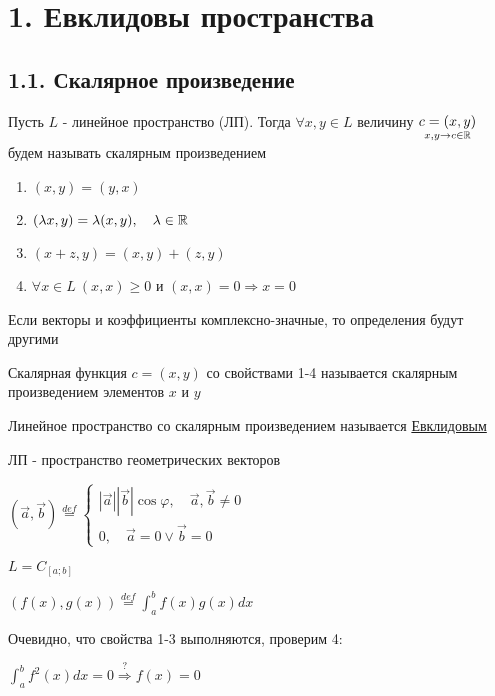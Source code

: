 \documentclass[12pt]{article}
\begin{document}
    \section{1. Евклидовы пространства}

    \subsection{1.1. Скалярное произведение}

    Пусть $L$ - линейное пространство (ЛП). Тогда $\forall x, y \in L$ величину $\underset{x, y \to c \in \mathbb{R}}{c = (x, y)}$
    будем называть скалярным произведением


    \hypertarget{scalarproductdefinition}{}

    \begin{enumerate}
        \item $(x, y) = (y, x)$
        \item $(\lambda x, y) = \lambda (x, y), \quad \lambda \in \mathbb{R}$
        \item $(x + z, y) = (x, y) + (z, y)$
        \item $\forall x \in L\ (x, x) \geq 0$ и $(x, x) = 0 \Longrightarrow x = 0$
    \end{enumerate}

    \Notas Если векторы и коэффициенты комплексно-значные, то определения будут другими

    \Def Скалярная функция $c = (x, y)$ со свойствами 1-4 называется скалярным произведением элементов $x$ и $y$

    \hypertarget{euclidspacedefinition}{}

    \Def Линейное пространство со скалярным произведением называется \underline{Евклидовым}

     ЛП - пространство геометрических векторов

    $(\vec{a}, \vec{b}) \stackrel{def}{=}
    \begin{cases}
        |\vec{a}||\vec{b}|\cos\varphi, \quad \vec{a}, \vec{b} \neq 0 \\
        0, \quad \vec{a} = 0 \lor \vec{b} = 0
    \end{cases}$

     $L = C_{[a;b]}$

    $(f(x), g(x)) \stackrel{def}{=} \int^b_a f(x)g(x) dx$

    Очевидно, что свойства 1-3 выполняются, проверим 4:

    $\int^b_a f^2(x) dx = 0 \stackrel{?}{\Longrightarrow} f(x) = 0$
\end{document}
